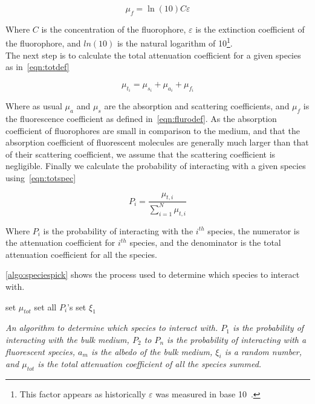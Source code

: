 \begin{equation}
\mu_f=\ln\left(10\right) C \varepsilon
\label{eqn:flurodef}
\end{equation}

Where $C$ is the concentration of the fluorophore, $\varepsilon$ is the extinction coefficient of the fluorophore, and $ln(10)$ is the natural logarithm of 10\footnote{This factor appears as historically $\varepsilon$ was measured in base 10~\cite{jacques2013optical}.}.\\

The next step is to calculate the total attenuation coefficient for a given species as in~\cref{eqn:totdef}

\begin{equation}
\mu_{t_i}=\mu_{s_i}+\mu_{a_i}+\mu_{f_i}
\label{eqn:totdef}
\end{equation}

Where as usual $\mu_a$ and $\mu_s$ are the absorption and scattering coefficients, and $\mu_f$ is the fluorescence coefficient as defined in~\cref{eqn:flurodef}.
As the absorption coefficient of fluorophores are small in comparison to the medium, and that the absorption coefficient of fluorescent molecules are generally much larger than that of their scattering coefficient, we assume that the scattering coefficient is negligible.
Finally we calculate the probability of interacting with a given species using~\cref{eqn:totspec}

\begin{equation}
P_i=\frac{\mu_{t,i}}{\sum\limits_{i=1}^{N} \mu_{t,i}}
\label{eqn:totspec}
\end{equation}

Where $P_i$ is the probability of interacting with the $i^{th}$ species, the numerator is the attenuation coefficient for $i^{th}$ species, and the denominator is the total attenuation coefficient for all the species.

\cref{algo:speciespick} shows the process used to determine which species to interact with.

\begin{center}
\begin{algorithm}[H]
\SetAlgoLined
  set $\mu_{tot}$\;
  set all $P_i$'s\;
  set $\xi_1$\;
\
\caption{\textit{An algorithm to determine which species to interact with. $P_1$ is the probability of interacting with the bulk medium, $P_2$ to $P_n$ is the probability of interacting with a fluorescent species, $a_m$ is the albedo of the bulk medium, $\xi_i$ is a random number, and $\mu_{tot}$ is the total attenuation coefficient of all the species summed.}}
\label{algo:speciespick}
\end{algorithm}
\end{center}

